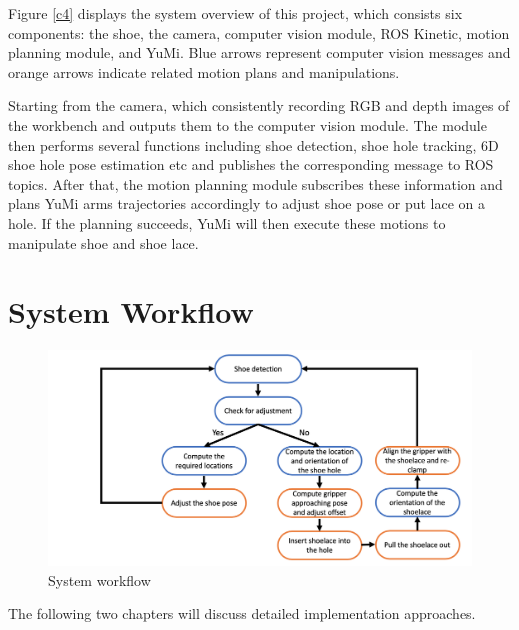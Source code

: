 Figure \ref{c4} displays the system overview of this project, which consists six components: the shoe, the camera, computer vision module, ROS Kinetic, motion planning module, and YuMi. Blue arrows represent computer vision messages and orange arrows indicate related motion plans and manipulations.

Starting from the camera, which consistently recording RGB and depth images of the workbench and outputs them to the computer vision module. The module then performs several functions including shoe detection, shoe hole tracking, 6D shoe hole pose estimation etc and publishes the corresponding message to ROS topics. After that, the motion planning module subscribes these information and plans YuMi arms trajectories accordingly to adjust shoe pose or put lace on a hole. If the planning succeeds, YuMi will then execute these motions to manipulate shoe and shoe lace.

\section{System Workflow}

\begin{figure}[H]
\centering
\includegraphics[width = \columnwidth]{AnalysisDesign/workflow.png}
\caption{System workflow}
\label{workflow}
\end{figure}

The following two chapters will discuss detailed implementation approaches.